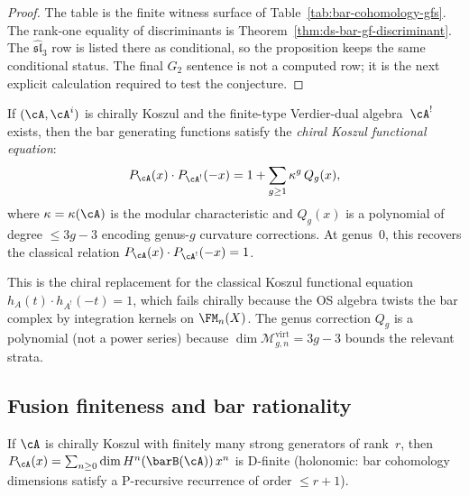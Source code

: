 \begin{proof}
The table is the finite witness surface of
Table~\ref{tab:bar-cohomology-gfs}.  The rank-one equality of
discriminants is Theorem~\ref{thm:ds-bar-gf-discriminant}.  The
$\widehat{\mathfrak{sl}}_3$ row is listed there as conditional, so
the proposition keeps the same conditional status.  The final
$G_2$ sentence is not a computed row; it is the next explicit
calculation required to test the conjecture.
\end{proof}

\begin{conjecture}
\label{conj:chiral-koszul-functional-equation}
If $(\cA,\cA^i)$ is chirally Koszul and the finite-type
Verdier-dual algebra~$\cA^!$ exists, then the bar generating
functions satisfy the \emph{chiral Koszul functional equation}:
\begin{equation}\label{eq:chiral-koszul-fe}
 P_\cA(x) \cdot P_{\cA^!}(-x)
 = 1 + \sum_{g \geq 1} \kappa^g \, Q_g(x),
\end{equation}
where $\kappa = \kappa(\cA)$ is the modular characteristic and
$Q_g(x)$ is a polynomial of degree $\leq 3g - 3$ encoding
genus-$g$ curvature corrections. At genus~$0$, this recovers
the classical relation $P_\cA(x) \cdot P_{\cA^!}(-x) = 1$.
\end{conjecture}

\noindent
This is the chiral replacement for the classical Koszul functional
equation $h_A(t) \cdot h_{A^!}(-t) = 1$, which fails chirally
because the OS algebra twists the bar complex by integration kernels
on $\FM_n(X)$. The genus correction $Q_g$ is a polynomial (not a
power series) because $\dim \mathcal{M}_{g,n}^{\mathrm{virt}} = 3g-3$
bounds the relevant strata.

\subsection{Fusion finiteness and bar rationality}

\begin{conjecture}
\label{conj:fusion-finiteness-koszulness}
If $\cA$ is chirally Koszul with finitely many strong generators
of rank~$r$, then $P_\cA(x) = \sum_{n \geq 0}
\dim H^n(\barB(\cA))\, x^n$ is D-finite
\textup{(}holonomic: bar cohomology dimensions satisfy a
P-recursive recurrence of order $\leq r + 1$\textup{)}.
\end{conjecture}

